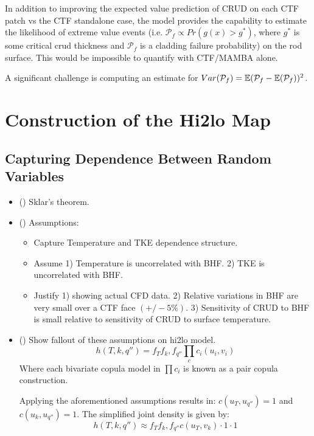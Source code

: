 In addition to improving the expected value prediction of CRUD on each CTF patch vs the CTF standalone case, the model provides the capability to estimate the likelihood of extreme value events (i.e. $\mathcal P_f \propto Pr(g(x) > g^*)$, where $g^*$ is some critical crud thickness and $\mathcal P_f$ is a cladding failure probability) on the rod surface.  This would be impossible to quantify with CTF/MAMBA alone.

A significant challenge is computing an estimate for $Var(\mathcal P_f) = \operatorname*{\mathbb{E}}(\mathcal P_f - \operatorname*{\mathbb{E}}(\mathcal P_f))^2$.


\section{Construction of the Hi2lo Map}

\subsection{Capturing Dependence Between Random Variables}
\begin{itemize}
        \item (\checkmark) Sklar's theorem.
        \item (\checkmark) Assumptions:
        \begin{itemize}
                \item Capture Temperature and TKE dependence structure.
                \item Assume 1) Temperature is uncorrelated with BHF.  2) TKE is uncorrelated with BHF.
                \item Justify 1) showing actual CFD data. 2) Relative variations in BHF are very small over a CTF face $(+/- 5\%)$.  3) Sensitivity of CRUD to BHF is small relative to sensitivity of CRUD to surface temperature.
        \end{itemize}
        \item (\checkmark) Show fallout of these assumptions on hi2lo model.
        \begin{equation}
                h(T, k, q'') = f_T f_k, f_{q''} \prod_c c_i(u_i, v_i)
        \end{equation}
        Where each bivariate copula model in $\prod c_i $ is known as a pair copula construction.

        Applying the aforementioned assumptions results in: $c(u_T, u_{q''}) = 1$ and $c(u_{k}, u_{q''}) = 1$. The simplified joint density is given by:
        \begin{equation}
                h(T, k, q'') \approx  f_T f_k, f_{q''} c(u_{T}, v_{k})  \cdot 1 \cdot 1
    \end{equation}
\end{itemize}


